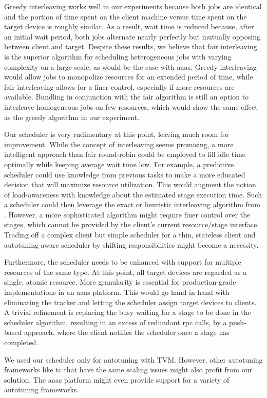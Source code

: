 Greedy interleaving works well in our experiments because both jobs are identical and the portion of time spent on the client machine versus time spent on the target device is roughly similar. As a result, wait time is reduced because, after an initial wait period, both jobs alternate nearly perfectly but mutually opposing between client and target. Despite these results, we believe that fair interleaving is the superior algorithm for scheduling heterogeneous jobs with varying complexity on a large scale, as would be the case with \gls{aaas}. Greedy interleaving would allow jobs to monopolize resources for an extended period of time, while fair interleaving allows for a finer control, especially if more resources are available. Bundling in conjunction with the fair algorithm is still an option to interleave homogeneous jobs on few resources, which would show the same effect as the greedy algorithm in our experiment.

Our scheduler is very rudimentary at this point, leaving much room for improvement. While the concept of interleaving seems promising, a more intelligent approach than fair round-robin could be employed to fill idle time optimally while keeping average wait time low. For example, a predictive scheduler could use knowledge from previous tasks to make a more educated decision that will maximize resource utilization. This would augment the notion of load-awareness with knowledge about the estimated stage execution time. Such a scheduler could then leverage the exact or heuristic interleaving algorithm from \cite{Ma.2005}. However, a more sophisticated algorithm might require finer control over the stages, which cannot be provided by the client's current resource/stage interface. Trading off a complex client but simple scheduler for a thin, stateless client and autotuning-aware scheduler by shifting responsibilities might become a necessity.

Furthermore, the scheduler needs to be enhanced with support for multiple resources of the same type. At this point, all target devices are regarded as a single, atomic resource. More granularity is essential for production-grade implementations in an \gls{aaas} platform. This would go hand in hand with eliminating the tracker and letting the scheduler assign target devices to clients. A trivial refinement is replacing the busy waiting for a stage to be done in the scheduler algorithm, resulting in an excess of redundant \gls{rpc} calls, by a push-based approach, where the client notifies the scheduler once a stage has completed.

We used our scheduler only for autotuning with TVM. However, other autotuning frameworks like \gls{tc} that have the same scaling issues might also profit from our solution. The \gls{aaas} platform might even provide support for a variety of autotuning frameworks.
